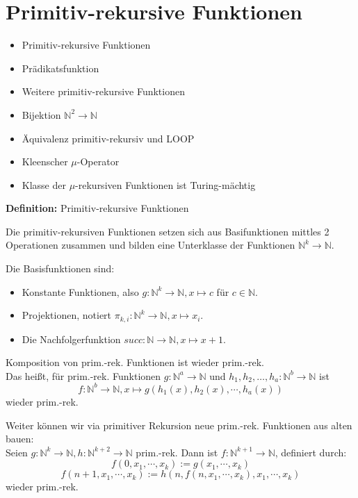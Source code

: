 \documentclass[a4paper,graphics,11pt]{article}
\begin{document}
\newpage

\section{Primitiv-rekursive Funktionen}


\begin{itemize}
    \item Primitiv-rekursive Funktionen
    \item Prädikatsfunktion
    \item Weitere primitiv-rekursive Funktionen
    \item Bijektion $\mathbb{N}^2 \to \mathbb{N}$
    \item Äquivalenz primitiv-rekursiv und LOOP
    \item Kleenscher $\mu$-Operator
    \item Klasse der $\mu$-rekursiven Funktionen ist Turing-mächtig
\end{itemize}

\textbf{Definition:} Primitiv-rekursive Funktionen

Die primitiv-rekursiven Funktionen setzen sich aus Basifunktionen mittles 2 Operationen
zusammen und bilden eine Unterklasse der Funktionen $\mathbb{N}^k \to \mathbb{N}$.

Die Basisfunktionen sind:
\begin{itemize}
    \item Konstante Funktionen, also $g: \mathbb{N}^k \to \mathbb{N}, x \mapsto c$ für $c \in \mathbb{N}$.
    \item Projektionen, notiert $\pi_{k,i}: \mathbb{N}^k \to \mathbb{N}, x \mapsto x_i$.
    \item Die Nachfolgerfunktion $succ : \mathbb{N} \to \mathbb{N}, x \mapsto x+1$.
\end{itemize}
Komposition von prim.-rek. Funktionen ist wieder prim.-rek.\\
Das heißt, für prim.-rek. Funktionen
$g : \mathbb{N}^a \to \mathbb{N}$ und $h_1,h_2,\dots,h_a : \mathbb{N}^b \to \mathbb{N}$ ist
$$
    f: \mathbb{N}^b \to \mathbb{N}, x \mapsto g(h_1(x), h_2(x), \cdots, h_a(x))
$$
wieder prim.-rek.

Weiter können wir via primitiver Rekursion neue prim.-rek. Funktionen aus alten bauen:\\
Seien $g: \mathbb{N}^k \to \mathbb{N}, h: \mathbb{N}^{k+2} \to \mathbb{N}$ prim.-rek.
Dann ist $f: \mathbb{N}^{k+1} \to \mathbb{N}$, definiert durch:
$$
    f(0,x_1,\cdots,x_k) := g(x_1,\cdots,x_k)
$$$$
    f(n+1,x_1,\cdots,x_k) := h(n, f(n,x_1,\cdots,x_k), x_1,\cdots,x_k)
$$
wieder prim.-rek.
\end{document}
